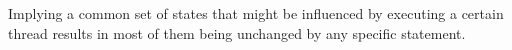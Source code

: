 \noindent
Implying a common set of states that might be influenced by executing a certain thread
results in most of them being unchanged by any specific statement.
